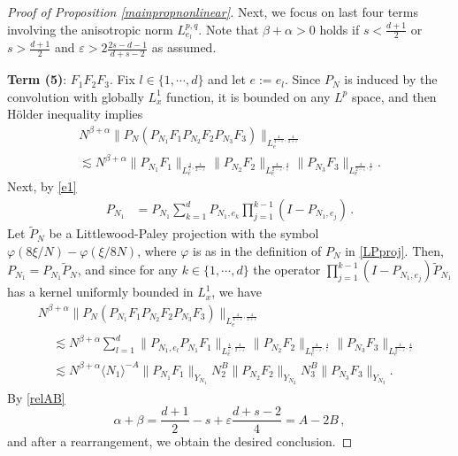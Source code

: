 \documentclass[10pt,leqno]{amsart}
\numberwithin{equation}{section}
\begin{document}
\begin{proof}[Proof of Proposition \ref{mainpropnonlinear}]
Next, we focus on last four terms involving the anisotropic norm $L_{e_l}^{p,q}$. 
Note that $\beta +\alpha>0$ holds if $s<\frac{d+1}{2}$ or $s>\frac{d+1}{2}$ and $\varepsilon> 2\frac{2s-d-1}{d+s-2}$ as assumed.


\textbf{Term (5)}: $F_1 F_2 F_3$. 
Fix $l \in \{1, \cdots, d\}$ and let $e := e_l$.
Since $P_N$ is induced by the convolution with globally $L^1_x$ function, it is bounded on any $L^p$ space, and  then H\"older inequality implies
\begin{multline*}
N^{\beta +\alpha} \|P_N (P_{N_1} F_1 P_{N_2} F_2 P_{N_3} F_3) \|_{L^{\frac{4}{4-\varepsilon} ,\frac{4}{2+\varepsilon}}_e}\\
 \lesssim N^{\beta +\alpha} \|P_{N_1} F_1\|_{L_e^{\frac{4}{\varepsilon} ,\frac{4}{2-\varepsilon}}} \|P_{N_2} F_2\|_{L_e^{\frac{4}{2-\varepsilon} ,\frac{4}{\varepsilon}}} \|P_{N_3} F_3\|_{L_e^{\frac{4}{2-\varepsilon} ,\frac{4}{\varepsilon}}}.
\end{multline*}
Next, by \eqref{e1}
\begin{align*}
P_{N_1}&= P_{N_1} \sum_{k = 1}^d P_{N_1 ,e_k} \prod_{j = 1}^{k - 1} (I - P_{N_1, e_j})
\,.
\end{align*}
Let $\tilde{P}_N$ be a Littlewood-Paley projection with the symbol  $\varphi(8\xi/N) - \varphi(\xi/8N)$, where $\varphi$ is as in the definition of $P_N$ in \eqref{LPproj}. 
Then, $P_{N_1} = P_{N_1}\tilde{P}_N$,
and since for any $k \in \{1, \cdots, d\}$ the operator $\prod_{j = 1}^{k - 1} (I - P_{N_1, e_j}) \tilde{P}_{N_1}$ has a kernel uniformly bounded in $L_x^1$, we have
\begin{multline*}
N^{\beta +\alpha} \|P_N (P_{N_1} F_1 P_{N_2} F_2 P_{N_3} F_3) \|_{L^{\frac{4}{4-\varepsilon} ,\frac{4}{2+\varepsilon}}_e}\\
\begin{aligned}
& \lesssim N^{\beta +\alpha}\sum_{l=1}^d \|P_{N_1,e_l} P_{N_1} F_1\|_{L_e^{\frac{4}{\varepsilon} ,\frac{4}{2-\varepsilon}}} \|P_{N_2} F_2\|_{L_e^{\frac{4}{2-\varepsilon} ,\frac{4}{\varepsilon}}} \|P_{N_3} F_3\|_{L_e^{\frac{4}{2-\varepsilon} ,\frac{4}{\varepsilon}}}\\
&\lesssim N^{\beta +\alpha} \langle N_1\rangle^{-A}  \| P_{N_1} F_1\|_{Y_{N_1}} N_2^B \|P_{N_2} F_2\|_{Y_{N_2}} N_3^B \|P_{N_3} F_3\|_{Y_{N_3}}.
\end{aligned}
\end{multline*}
By \eqref{relAB}
$$
\alpha+\beta= \frac{d+1}{2} -s +\varepsilon \dfrac{d+s-2}{4} = A - 2B \,,
$$
and after a rearrangement, 
we obtain the desired conclusion. 



\end{proof}
\end{document}
